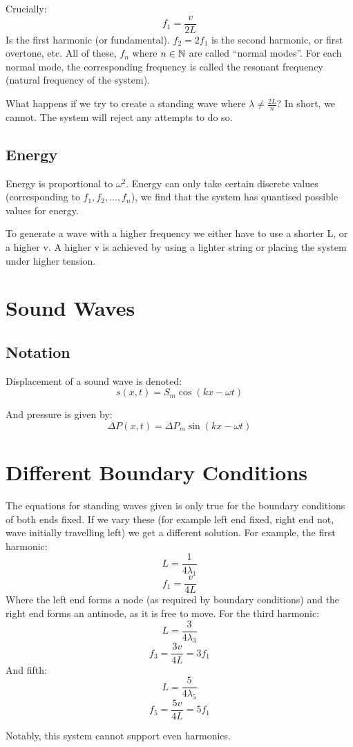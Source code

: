 Crucially: 
\[
    f_1 = \frac{v}{2L}
\]
Is the first harmonic (or fundamental). $f_2 = 2f_1$ is the second harmonic, or first overtone, etc. All of these, $f_n$ where $n \in \mathbb{N}$ are called ``normal modes''. For each normal mode, the corresponding frequency is called the resonant frequency (natural frequency of the system).

What happens if we try to create a standing wave where $\lambda \neq \frac{2L}{n}$? In short, we cannot. The system will reject any attempts to do so.

\subsection*{Energy}
Energy is proportional to $\omega^2$. Energy can only take certain discrete values (corresponding to $f_1, f_2, \ldots, f_n$), we find that the system has quantised possible values for energy.

To generate a wave with a higher frequency we either have to use a shorter L, or a higher v. A higher v is achieved by using a lighter string or placing the system under higher tension.

\section*{Sound Waves}
\subsection*{Notation}
Displacement of a sound wave is denoted:
\[
    s(x, t) = S_m \cos(kx - \omega t)
\]

And pressure is given by:
\[
    \Delta P(x, t) = \Delta P_m \sin(kx - \omega t)
\]

\section*{Different Boundary Conditions}
The equations for standing waves given is only true for the boundary conditions of both ends fixed. If we vary these (for example left end fixed, right end not, wave initially travelling left) we get a different solution. For example, the first harmonic:
\[
    L = \frac{1}{4 \lambda_1}
\]
\[
    f_1 = \frac{v}{4L}
\]
Where the left end forms a node (as required by boundary conditions) and the right end forms an antinode, as it is free to move. For the third harmonic:
\[
    L = \frac{3}{4 \lambda_3}
\]
\[
    f_3 = \frac{3v}{4L} = 3 f_1
\]
And fifth:
\[
    L = \frac{5}{4 \lambda_5}
\]
\[
    f_5 = \frac{5v}{4L} = 5f_1
\]

Notably, this system cannot support even harmonics.









